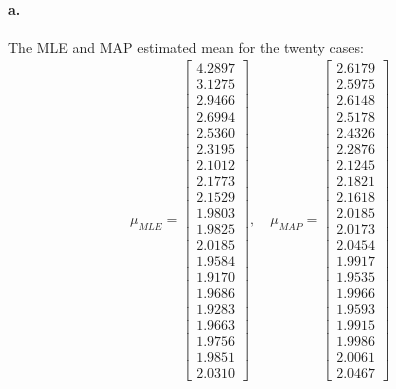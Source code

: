 \documentclass[a4paper]{article}
\begin{document}
\paragraph{a.} The MLE and MAP estimated mean for the twenty cases: \\
\begin{align*}
	\mu_{MLE} = \begin{bmatrix}
		4.2897 \\
    	3.1275 \\
    	2.9466 \\
    	2.6994 \\
    	2.5360 \\
    	2.3195 \\
    	2.1012 \\
    	2.1773 \\
    	2.1529 \\
    	1.9803 \\
    	1.9825 \\
    	2.0185 \\
    	1.9584 \\
    	1.9170 \\
    	1.9686 \\
    	1.9283 \\
    	1.9663 \\
    	1.9756 \\
    	1.9851 \\
    	2.0310
	\end{bmatrix}, \quad
	\mu_{MAP} = \begin{bmatrix}
		2.6179 \\
    	2.5975 \\
    	2.6148 \\
    	2.5178 \\
    	2.4326 \\
    	2.2876 \\
    	2.1245 \\
    	2.1821 \\
   		2.1618 \\
    	2.0185 \\
    	2.0173 \\
    	2.0454 \\
    	1.9917 \\
    	1.9535 \\
    	1.9966 \\
    	1.9593 \\
    	1.9915 \\
    	1.9986 \\
    	2.0061 \\
    	2.0467
	\end{bmatrix}
\end{align*}
\end{document}
